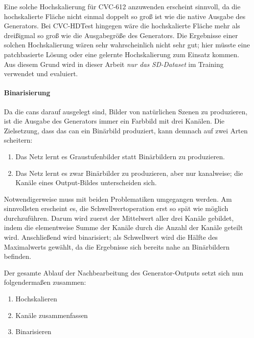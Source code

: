 Eine solche Hochskalierung für CVC-612 anzuwenden erscheint sinnvoll, da die hochskalierte Fläche nicht einmal doppelt so groß ist wie die native Ausgabe des Generators.
Bei CVC-HDTest hingegen wäre die hochskalierte Fläche mehr als dreißigmal so groß wie die Ausgabegröße des Generators.
Die Ergebnisse einer solchen Hochskalierung wären sehr wahrscheinlich nicht sehr gut; hier müsste eine patchbasierte Lösung oder eine gelernte Hochskalierung zum Einsatz kommen.
Aus diesem Grund wird in dieser Arbeit \emph{nur das SD-Dataset} im Training verwendet und evaluiert.



\paragraph{Binarisierung}

Da die \glspl{can} darauf ausgelegt sind, Bilder von natürlichen Szenen zu produzieren, ist die Ausgabe des Generators immer ein Farbbild mit drei Kanälen.
Die Zielsetzung, dass das \gls{can} ein Binärbild produziert, kann demnach auf zwei Arten scheitern:

\begin{enumerate}
	\item Das Netz lernt es Graustufenbilder statt Binärbildern zu produzieren.
	\item Das Netz lernt es zwar Binärbilder zu produzieren, aber nur kanalweise; die Kanäle eines Output-Bildes unterscheiden sich.
\end{enumerate}

Notwendigerweise muss mit beiden Problematiken umgegangen werden.
Am sinnvollsten erscheint es, die Schwellwertoperation erst so spät wie möglich durchzuführen.
Darum wird zuerst der Mittelwert aller drei Kanäle gebildet, indem die elementweise Summe der Kanäle durch die Anzahl der Kanäle geteilt wird.
Anschließend wird binarisiert; als Schwellwert wird die Hälfte des Maximalwerts gewählt, da die Ergebnisse sich bereits nahe an Binärbildern befinden.

Der gesamte Ablauf der Nachbearbeitung des Generator-Outputs setzt sich nun folgendermaßen zusammen:

\begin{enumerate}
	\item Hochskalieren
	\item Kanäle zusammenfassen
	\item Binarisieren
\end{enumerate}



